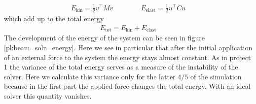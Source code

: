 \documentclass{report}
\newcounter{constant}
\begin{document}
\begin{align*}
	E_{\text{kin}} = \frac{1}{2}v^\top Mv
	\qquad\qquad E_{\text{elast}} = \frac{1}{2}u^\top Cu
\end{align*}
which add up to the total energy
\begin{align*}
	E_{\text{tot}}=E_{\text{kin}}+E_{\text{elast}}
\end{align*}
The development of the energy of the system can be seen in figure \ref{pl:beam_soln_energy}. Here we see in particular that after the initial application of an external force to the system the energy stays almost constant. As in project 1 the variance of the total energy serves as a measure of the instability of the solver. Here we calculate this variance only for the latter $4/5$ of the simulation because in the first part the applied force changes the total energy.
With an ideal solver this quantity vanishes.
\end{document}
